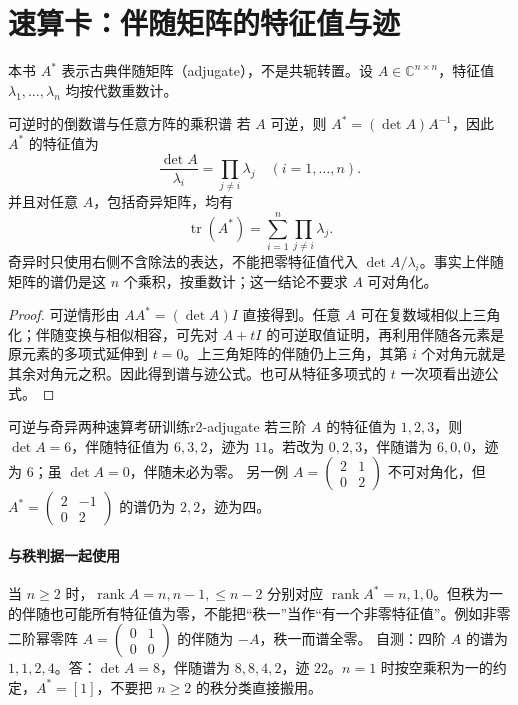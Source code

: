 \section{速算卡：伴随矩阵的特征值与迹}\label{r2:adjugate}
本书 $A^*$ 表示古典伴随矩阵（adjugate），不是共轭转置。设 $A\in\mathbb C^{n\times n}$，特征值 $\lambda_1,\ldots,\lambda_n$ 均按代数重数计。

\begin{theorem}{可逆时的倒数谱与任意方阵的乘积谱}
若 $A$ 可逆，则 $A^*=(\det A)A^{-1}$，因此 $A^*$ 的特征值为
\[
 \frac{\det A}{\lambda_i}=\prod_{j\ne i}\lambda_j\quad(i=1,\ldots,n).
\]
并且对任意 $A$，包括奇异矩阵，均有
\[
 \operatorname{tr}(A^*)=\sum_{i=1}^n\prod_{j\ne i}\lambda_j.
\]
奇异时只使用右侧不含除法的表达，不能把零特征值代入 $\det A/\lambda_i$。事实上伴随矩阵的谱仍是这 $n$ 个乘积，按重数计；这一结论不要求 $A$ 可对角化。
\end{theorem}
\begin{proof}
可逆情形由 $AA^*=(\det A)I$ 直接得到。任意 $A$ 可在复数域相似上三角化；伴随变换与相似相容，可先对 $A+tI$ 的可逆取值证明，再利用伴随各元素是原元素的多项式延伸到 $t=0$。上三角矩阵的伴随仍上三角，其第 $i$ 个对角元就是其余对角元之积。因此得到谱与迹公式。也可从特征多项式的 $t$ 一次项看出迹公式。
\end{proof}

\begin{example}{可逆与奇异两种速算}{考研训练}{r2-adjugate}
若三阶 $A$ 的特征值为 $1,2,3$，则 $\det A=6$，伴随特征值为 $6,3,2$，迹为 $11$。若改为 $0,2,3$，伴随谱为 $6,0,0$，迹为 $6$；虽 $\det A=0$，伴随未必为零。
另一例 $A=\begin{pmatrix}2&1\\0&2\end{pmatrix}$ 不可对角化，但 $A^*=\begin{pmatrix}2&-1\\0&2\end{pmatrix}$ 的谱仍为 $2,2$，迹为四。
\end{example}

\paragraph{与秩判据一起使用}
当 $n\ge2$ 时，$\operatorname{rank}A=n,n-1,\le n-2$ 分别对应 $\operatorname{rank}A^*=n,1,0$。但秩为一的伴随也可能所有特征值为零，不能把“秩一”当作“有一个非零特征值”。例如非零二阶幂零阵 $A=\begin{pmatrix}0&1\\0&0\end{pmatrix}$ 的伴随为 $-A$，秩一而谱全零。
自测：四阶 $A$ 的谱为 $1,1,2,4$。答：$\det A=8$，伴随谱为 $8,8,4,2$，迹 $22$。$n=1$ 时按空乘积为一的约定，$A^*=[1]$，不要把 $n\ge2$ 的秩分类直接搬用。

